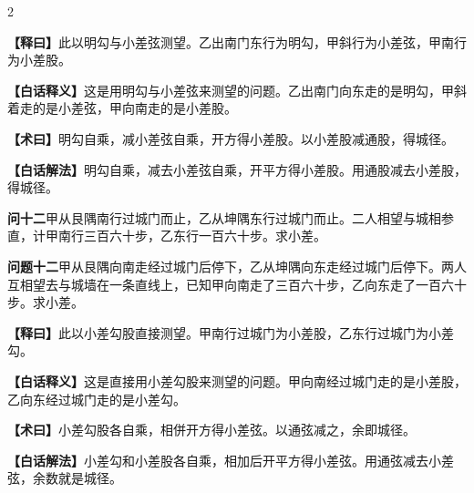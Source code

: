 \documentclass[11pt,a4paper]{article}
\newcommand{\WenQuestion}[1]{\textbf{\textcolor{classicalcolor}{#1}}}
\newcommand{\BaiQuestion}[1]{\textbf{\textcolor{moderncolor}{#1}}}
\newcommand{\WenExplain}{\textcolor{classicalcolor}{\textbf{【释曰】}}}
\newcommand{\BaiExplain}{\textcolor{moderncolor}{\textbf{【白话释义】}}}
\newcommand{\WenMethod}{\textcolor{classicalcolor}{\textbf{【术曰】}}}
\newcommand{\BaiMethod}{\textcolor{moderncolor}{\textbf{【白话解法】}}}
\begin{document}
\begin{paracol}{2}
\switchcolumn*
\begin{tcolorbox}[colback=red!5,colframe=red!30!black,boxrule=0.3pt]
\WenExplain\quad 此以明勾与小差弦测望。乙出南门东行为明勾，甲斜行为小差弦，甲南行为小差股。
\end{tcolorbox}
\switchcolumn
\begin{tcolorbox}[colback=blue!5,colframe=blue!30!black,boxrule=0.3pt]
\BaiExplain\quad 这是用明勾与小差弦来测望的问题。乙出南门向东走的是明勾，甲斜着走的是小差弦，甲向南走的是小差股。
\end{tcolorbox}

\switchcolumn*
\begin{tcolorbox}[colback=red!5,colframe=red!40!black,boxrule=0.3pt]
\WenMethod\quad 明勾自乘，减小差弦自乘，开方得小差股。以小差股减通股，得城径。
\end{tcolorbox}
\switchcolumn
\begin{tcolorbox}[colback=blue!5,colframe=blue!40!black,boxrule=0.3pt]
\BaiMethod\quad 明勾自乘，减去小差弦自乘，开平方得小差股。用通股减去小差股，得城径。
\end{tcolorbox}

\vspace{0.8em}

\switchcolumn*
\begin{tcolorbox}[colback=red!3,colframe=red!30!black,boxrule=0.3pt]
\WenQuestion{问十二}\quad 甲从艮隅南行过城门而止，乙从坤隅东行过城门而止。二人相望与城相参直，计甲南行三百六十步，乙东行一百六十步。求小差。
\end{tcolorbox}
\switchcolumn
\begin{tcolorbox}[colback=blue!3,colframe=blue!30!black,boxrule=0.3pt]
\BaiQuestion{问题十二}\quad 甲从艮隅向南走经过城门后停下，乙从坤隅向东走经过城门后停下。两人互相望去与城墙在一条直线上，已知甲向南走了三百六十步，乙向东走了一百六十步。求小差。
\end{tcolorbox}

\switchcolumn*
\begin{tcolorbox}[colback=red!5,colframe=red!30!black,boxrule=0.3pt]
\WenExplain\quad 此以小差勾股直接测望。甲南行过城门为小差股，乙东行过城门为小差勾。
\end{tcolorbox}
\switchcolumn
\begin{tcolorbox}[colback=blue!5,colframe=blue!30!black,boxrule=0.3pt]
\BaiExplain\quad 这是直接用小差勾股来测望的问题。甲向南经过城门走的是小差股，乙向东经过城门走的是小差勾。
\end{tcolorbox}

\switchcolumn*
\begin{tcolorbox}[colback=red!5,colframe=red!40!black,boxrule=0.3pt]
\WenMethod\quad 小差勾股各自乘，相併开方得小差弦。以通弦减之，余即城径。
\end{tcolorbox}
\switchcolumn
\begin{tcolorbox}[colback=blue!5,colframe=blue!40!black,boxrule=0.3pt]
\BaiMethod\quad 小差勾和小差股各自乘，相加后开平方得小差弦。用通弦减去小差弦，余数就是城径。
\end{tcolorbox}


\end{paracol}
\end{document}
